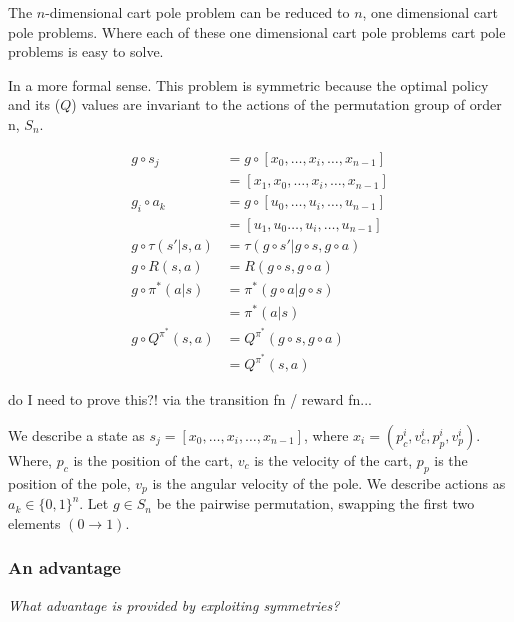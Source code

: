 The $n$-dimensional cart pole problem can be reduced to $n$, one dimensional cart pole problems.
Where each of these one dimensional cart pole problems cart pole problems is easy to solve.

In a more formal sense. This problem is symmetric because the optimal policy and its ($Q$) values are invariant to the actions of the permutation group of order n, $S_n$.

\begin{align*}
g \circ s_j &= g \circ [x_0, \dots, x_i, \dots, x_{n-1}] \\
&= [x_1, x_0, \dots, x_i, \dots, x_{n-1}] \\
g_i \circ a_k &= g \circ [u_0, \dots, u_i, \dots, u_{n-1}] \\
&= [u_1, u_0 \dots, u_i, \dots, u_{n-1}] \\
g\circ \tau(s'|s, a) &= \tau(g\circ s'|g\circ s, g\circ a) \\
g\circ R(s, a) &= R(g\circ s, g\circ a) \\
g\circ \pi^{* }(a|s) &= \pi^{* }(g\circ a| g\circ s) \\
&= \pi^{* }(a|s) \tag{invariance of the optimal policy}\\
g\circ Q^{\pi^{* }}(s, a) &= Q^{\pi^{* }}(g\circ s, g\circ a) \\
&= Q^{\pi^{* }}(s, a) \tag{invariance of the optimal values}
\end{align*}

{\color{red}do I need to prove this?! via the transition fn / reward fn...}

We describe a state as $s_j = [x_0, \dots, x_i, \dots, x_{n-1}]$, where $x_i = (p_c^i, v_c^i, p_p^i, v_p^i)$. Where, $p_c$ is the position of the cart, $v_c$ is the velocity of the cart, $p_p$ is the position of the pole, $v_p$ is the angular velocity of the pole. We describe actions as $a_k \in \{0, 1\}^n$. Let $g\in S_n$ be the pairwise permutation, swapping the first two elements $(0\to 1)$.



\subsubsection{An advantage}

\begin{displayquote}
\textit{What advantage is provided by exploiting symmetries?}
\end{displayquote}

